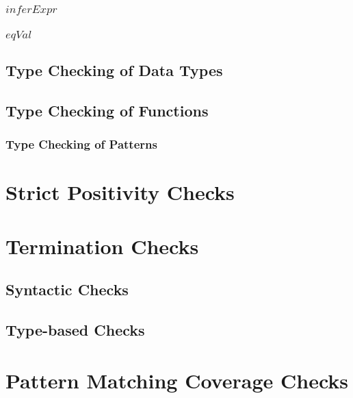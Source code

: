 \documentclass[acmsmall]{acmart}
\begin{document}



\subsubsection{$inferExpr$}

\subsubsection{$eqVal$}

\subsection{Type Checking of Data Types}

\subsection{Type Checking of Functions}

\subsubsection{Type Checking of Patterns}
\label{sec:typeCheckPattern}

\section{Strict Positivity Checks}
\label{sec:spos}

\section{Termination Checks}
\label{sec:termination}

\subsection{Syntactic Checks}

\subsection{Type-based Checks}

\section{Pattern Matching Coverage Checks}
\label{sec:pattern}
\end{document}
